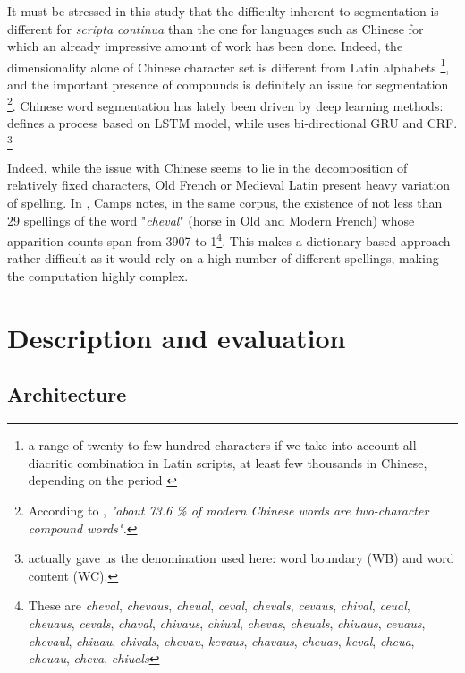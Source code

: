 \documentclass{jdmdh}
\begin{document}
It must be stressed in this study that the difficulty inherent to segmentation is different for \textit{scripta continua} than the one for languages such as Chinese for which an already impressive amount of work has been done. Indeed, the dimensionality alone of Chinese character set is different from Latin alphabets \footnote{a range of twenty to few hundred characters if we take into account all diacritic combination in Latin scripts, at least few thousands in Chinese, depending on the period \cite{routledge}}, and the important presence of compounds is definitely an issue for segmentation \footnote{According to \cite{tse2017chinese}, \textit{"about 73.6 \% of modern Chinese words are two-character compound words".}}. Chinese word segmentation has lately been driven by deep learning methods: \citet{chen2015long} defines a process based on LSTM model, while \citet{yu2019learning} uses bi-directional GRU and CRF. \footnote{\citet{huang2019realistic} actually gave us the denomination used here: word boundary (WB) and word content (WC).}

Indeed, while the issue with Chinese seems to lie in the decomposition of relatively fixed characters, Old French or Medieval Latin present heavy variation of spelling. In \citet{camps_pandora}, Camps notes, in the same corpus, the existence of not less than 29 spellings of the word "\textit{cheval}" (horse in Old and Modern French) whose apparition counts span from 3907 to 1\footnote{These are \textit{cheval}, \textit{chevaus}, \textit{cheual}, \textit{ceval}, \textit{chevals}, \textit{cevaus}, \textit{chival}, \textit{ceual}, \textit{cheuaus}, \textit{cevals}, \textit{chaval}, \textit{chivaus}, \textit{chiual}, \textit{chevas}, \textit{cheuals}, \textit{chiuaus}, \textit{ceuaus}, \textit{chevaul}, \textit{chiuau}, \textit{chivals}, \textit{chevau}, \textit{kevaus}, \textit{chavaus}, \textit{cheuas}, \textit{keval}, \textit{cheua}, \textit{cheuau}, \textit{cheva}, \textit{chiuals}}. This  makes a dictionary-based approach rather difficult as it would rely on a high number of different spellings, making the computation highly complex.

\section{Description and evaluation}

\subsection{Architecture}
\end{document}
